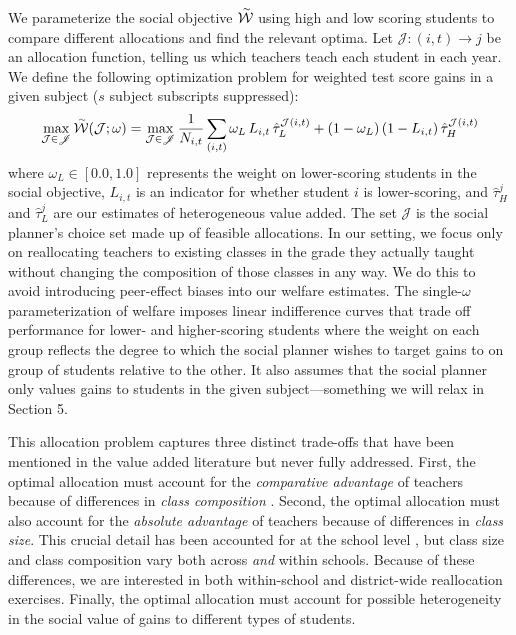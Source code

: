 \documentclass[12pt]{article}
\theoremstyle{definition}
\theoremstyle{definition}
\theoremstyle{definition}
\theoremstyle{definition}
\begin{document}
We parameterize the social objective $\accentset{\sim}{\mathcal{W}}$ using high and low scoring students to compare different allocations and find the relevant optima. Let $\mathcal{J}: (i,t)\to j$ be an allocation function, telling us which teachers teach each student in each year. We define the following optimization problem for weighted test score gains in a given subject ($s$ subject subscripts suppressed):
\begin{equation}\label{opt}
\max_{\mathcal{J}\in\mathscr{J}} \accentset{\sim}{\mathcal{W}}(\mathcal{J};\omega) = \max_{\mathcal{J}\in\mathscr{J}} \frac{1}{N_{i,t}}\sum_{(i,t)} \omega_{L} \,L_{i,t} \,\hat{\tau}^{\mathcal{J}(i,t)}_{L}  +(1-\omega_{L}) \, (1-L_{i,t}) \, \hat{\tau}^{\mathcal{J}(i,t)}_{H}
\end{equation}\noindent where $\omega_{L}\in[0.0,1.0]$ represents the weight on lower-scoring students in the social objective, $L_{i,t}$ is an indicator for whether student $i$ is lower-scoring, and $\hat{\tau}^j_{H}$ and $\hat{\tau}^j_{L}$ are our estimates of heterogeneous value added. The set $\mathscr{J}$ is the social planner's choice set made up of feasible allocations. In our setting, we focus only on reallocating teachers to existing classes in the grade they actually taught without changing the composition of those classes in any way. We do this to avoid introducing peer-effect biases into our welfare estimates.  The single-$\omega$ parameterization of welfare imposes linear indifference curves that trade off performance for lower- and higher-scoring students where the weight on each group reflects the degree to which the social planner wishes to target gains to on group of students relative to the other. It also assumes that the social planner only values gains to students in the given subject---something we will relax in Section 5.



This allocation problem captures three distinct trade-offs that have been mentioned in the value added literature but never fully addressed. First, the optimal allocation must account for the \textit{comparative advantage} of teachers because of differences in \textit{class composition} \citep[as pointed out in][]{Delgado2020}. Second, the optimal allocation must also account for the \textit{absolute advantage} of teachers because of differences in \textit{class size}. This crucial detail has been accounted for at the school level \citep[see][]{bates2022teacher}, but class size and class composition vary both across \textit{and} within schools. Because of these differences, we are interested in both within-school and district-wide reallocation exercises. Finally, the optimal allocation must account for possible heterogeneity in the social value of gains to different types of students. 
\end{document}
